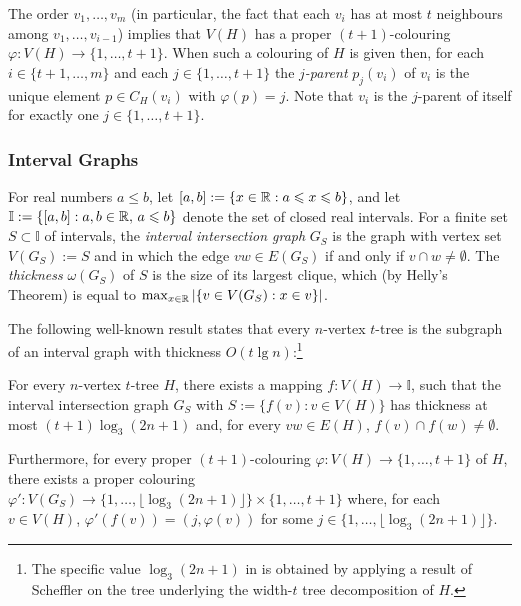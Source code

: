 \documentclass[kpfonts]{patmorin}
\let\le\leqslant
\begin{document}
The order $v_1,\ldots,v_m$ (in particular, the fact that each $v_i$ has at most $t$ neighbours among $v_1,\ldots,v_{i-1}$) implies that $V(H)$ has a proper $(t+1)$-colouring $\varphi:V(H)\to\{1,\ldots,t+1\}$.  When such a colouring of $H$ is given then, for each $i\in\{t+1,\ldots,m\}$ and each $j\in\{1,\ldots,t+1\}$ the \emph{$j$-parent} $p_j(v_i)$ of $v_i$ is the unique element $p\in C_H(v_i)$ with $\varphi(p)=j$.  Note that $v_i$ is the $j$-parent of itself for exactly one $j\in\{1,\ldots,t+1\}$.

\subsubsection{Interval Graphs}

For real numbers $a\le b$, let $[a,b]:=\{ x\in\R: a\le x\le b\}$, and let
$\mathbb{I}:=\{[a,b]: a,b\in\R,\, a\le b\}$ denote the set of closed real intervals.  For a finite set $S\subset\mathbb{I}$ of intervals, the \emph{interval intersection graph} $G_S$ is the graph with vertex set $V(G_S):=S$ and in which the edge $vw\in E(G_S)$ if and only if $v\cap w\neq \emptyset$.  The \emph{thickness} $\omega(G_S)$ of $S$ is the size of its largest clique, which (by Helly's Theorem) is equal to $\max_{x\in\mathbb{R}}|\{v\in V(G_S):x\in v\}|$.  


The following well-known result states that every $n$-vertex $t$-tree is the subgraph of an interval graph with thickness $O(t\lg n)$:\footnote{The specific value $\log_3 (2n+1)$ in  is obtained by applying a result of Scheffler \cite{scheffler:optimal} on the tree underlying the width-$t$ tree decomposition of $H$.}

\begin{lem}
  For every $n$-vertex $t$-tree $H$, there exists a mapping $f:V(H)\to\mathbb{I}$, such that the interval intersection graph $G_S$ with $S:=\{f(v):v\in V(H)\}$ has thickness at most $(t+1)\log_3(2n+1)$ and, for every $vw\in E(H)$, $f(v)\cap f(w)\neq\emptyset$.  
  
  Furthermore, for every proper $(t+1)$-colouring $\varphi:V(H)\to\{1,\ldots,t+1\}$ of $H$, there exists a proper colouring $\varphi':V(G_S)\to\{1,\ldots,\lfloor\log_3(2n+1)\rfloor\}\times\{1,\ldots,t+1\}$ where, for each $v\in V(H)$, $\varphi'(f(v))=(j,\varphi(v))$ for some $j\in\{1,\ldots,\lfloor\log_3(2n+1)\rfloor\}$.
\end{lem}
\end{document}
